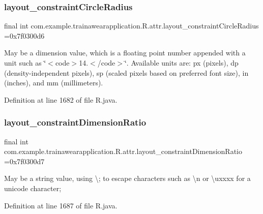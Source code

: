 \subsubsection{\texorpdfstring{layout\_constraintCircleRadius}{layout\_constraintCircleRadius}}
{\footnotesize\ttfamily final int com.\+example.\+trainawearapplication.\+R.\+attr.\+layout\+\_\+constraint\+Circle\+Radius =0x7f0300d6\hspace{0.3cm}{\ttfamily [static]}}

May be a dimension value, which is a floating point number appended with a unit such as \char`\"{}$<$code$>$14.\+5sp$<$/code$>$\char`\"{}. Available units are\+: px (pixels), dp (density-\/independent pixels), sp (scaled pixels based on preferred font size), in (inches), and mm (millimeters). 

Definition at line 1682 of file R.\+java.

\mbox{\label{classcom_1_1example_1_1trainawearapplication_1_1_r_1_1attr_ae8df2c3c86831da7a0d4dc70749edc1f}} 
\subsubsection{\texorpdfstring{layout\_constraintDimensionRatio}{layout\_constraintDimensionRatio}}
{\footnotesize\ttfamily final int com.\+example.\+trainawearapplication.\+R.\+attr.\+layout\+\_\+constraint\+Dimension\+Ratio =0x7f0300d7\hspace{0.3cm}{\ttfamily [static]}}

May be a string value, using \textquotesingle{}\textbackslash{};\textquotesingle{} to escape characters such as \textquotesingle{}\textbackslash{}n\textquotesingle{} or \textquotesingle{}\textbackslash{}uxxxx\textquotesingle{} for a unicode character; 

Definition at line 1687 of file R.\+java.

\mbox{\label{classcom_1_1example_1_1trainawearapplication_1_1_r_1_1attr_adf33cd682140f67e52f9397285432ea3}} 
